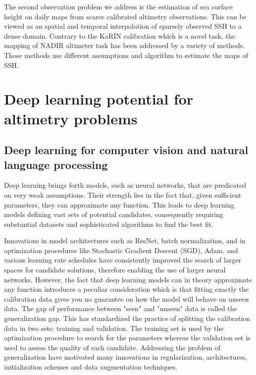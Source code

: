 \begin{bibunit}
The second observation problem we address is the estimation of sea surface height on daily maps from scarce calibrated altimetry observations. This can be viewed as an spatial and temporal interpolation of sparsely observed SSH to a dense domain.
Contrary to the KaRIN calibration which is a novel task, the mapping of NADIR altimeter task has been addressed by a variety of methods. Those methods use different assumptions and algorithm to estimate the maps of SSH.


\section{Deep learning potential for altimetry problems}

\subsection{Deep learning for computer vision and natural language processing}
Deep learning brings forth models, such as neural networks, that are predicated on very weak assumptions. Their strength lies in the fact that, given sufficient parameters, they can approximate any function\cite{}. This leads to deep learning models defining vast sets of potential candidates, consequently requiring substantial datasets and sophisticated algorithms to find the best fit.

Innovations in model architectures such as ResNet\cite{}, batch normalization\cite{}, and in optimization procedures\cite{} like Stochastic Gradient Descent (SGD)\cite{}, Adam\cite{}, and various learning rate schedules have consistently improved the search of larger spaces for candidate solutions, therefore  enabling the use of larger neural networks. 
However, the fact that deep learning models can in theory approximate any function introduces a peculiar consideration which is that fitting exactly the calibration data gives you no guarantee on how the model will behave on unseen data. The gap of performance between "seen" and "unseen" data is called the generalization gap. This has standardized the practice of splitting the calibration data in two sets: training and validation. The training set is used by the optimization procedure to search for the parameters whereas the validation set is used to assess the quality of each candidate. 
Addressing the problem of generalization have motivated many innovations in regularization, architectures, initialization schemes and data augmentation techniques.



\end{bibunit}
